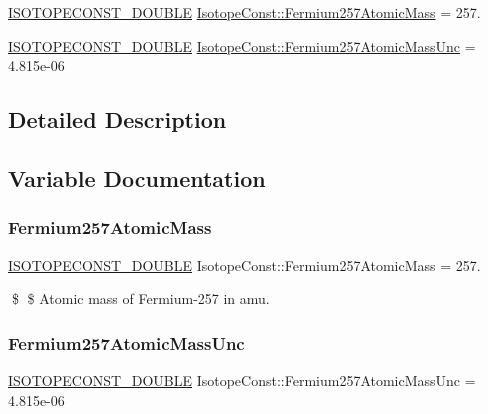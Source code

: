 \begin{DoxyCompactItemize}
\item 
\mbox{\hyperlink{group___isotope_const-_macros_ga8f45a7272ce02c0b4c65c44636ed719a}{I\+S\+O\+T\+O\+P\+E\+C\+O\+N\+S\+T\+\_\+\+D\+O\+U\+B\+LE}} \mbox{\hyperlink{group___isotope_const-_fermium-_fm257_ga84492946c6c6e246aee23a5fecced9e4}{Isotope\+Const\+::\+Fermium257\+Atomic\+Mass}} = 257.
\item 
\mbox{\hyperlink{group___isotope_const-_macros_ga8f45a7272ce02c0b4c65c44636ed719a}{I\+S\+O\+T\+O\+P\+E\+C\+O\+N\+S\+T\+\_\+\+D\+O\+U\+B\+LE}} \mbox{\hyperlink{group___isotope_const-_fermium-_fm257_gaa3eb48a682fbfd92308d32233dfa5cbd}{Isotope\+Const\+::\+Fermium257\+Atomic\+Mass\+Unc}} = 4.\+815e-\/06
\end{DoxyCompactItemize}


\subsection{Detailed Description}


\subsection{Variable Documentation}
\mbox{\label{group___isotope_const-_fermium-_fm257_ga84492946c6c6e246aee23a5fecced9e4}} 
\subsubsection{\texorpdfstring{Fermium257\+Atomic\+Mass}{Fermium257AtomicMass}}
{\footnotesize\ttfamily \mbox{\hyperlink{group___isotope_const-_macros_ga8f45a7272ce02c0b4c65c44636ed719a}{I\+S\+O\+T\+O\+P\+E\+C\+O\+N\+S\+T\+\_\+\+D\+O\+U\+B\+LE}} Isotope\+Const\+::\+Fermium257\+Atomic\+Mass = 257.}

\$ \$ Atomic mass of Fermium-\/257 in amu. \mbox{\label{group___isotope_const-_fermium-_fm257_gaa3eb48a682fbfd92308d32233dfa5cbd}} 
\subsubsection{\texorpdfstring{Fermium257\+Atomic\+Mass\+Unc}{Fermium257AtomicMassUnc}}
{\footnotesize\ttfamily \mbox{\hyperlink{group___isotope_const-_macros_ga8f45a7272ce02c0b4c65c44636ed719a}{I\+S\+O\+T\+O\+P\+E\+C\+O\+N\+S\+T\+\_\+\+D\+O\+U\+B\+LE}} Isotope\+Const\+::\+Fermium257\+Atomic\+Mass\+Unc = 4.\+815e-\/06}

